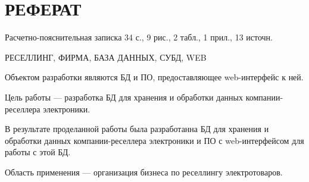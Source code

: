 \setcounter{page}{3}
\chapter*{\hfill{\centering РЕФЕРАТ}\hfill}

Расчетно-пояснительная записка 34 с., 9 рис., 2 табл., 1 прил., 13 источн.

\noindent РЕСЕЛЛИНГ, ФИРМА, БАЗА ДАННЫХ, СУБД, WEB

Объектом разработки являются БД и ПО, предоставляющее web-интерфейс к ней.

Цель работы --- разработка БД для хранения и обработки данных компании-реселлера электроники.

В результате проделанной работы была разработанна БД для хранения и обработки данных компании-реселлера электроники и ПО с web-интерфейсом для работы с этой БД.

Область применения --- организация бизнеса по реселлингу электротоваров.